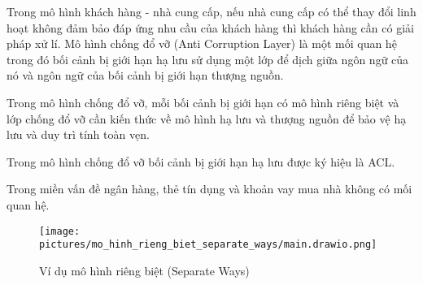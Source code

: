 
Trong mô hình khách hàng - nhà cung cấp, nếu nhà cung cấp có thể thay đổi linh hoạt không đảm bảo đáp ứng nhu cầu của khách hàng thì khách hàng cần có giải pháp xử lí. Mô hình chống đổ vỡ (Anti Corruption Layer) là một mối quan hệ trong đó bối cảnh bị giới hạn hạ lưu sử dụng một lớp để dịch giữa ngôn ngữ của nó và ngôn ngữ của bối cảnh bị giới hạn thượng nguồn.

Trong mô hình chống đổ vỡ, mỗi bối cảnh bị giới hạn có mô hình riêng biệt và lớp chống đổ vỡ cần kiến thức về mô hình hạ lưu và thượng nguồn để bảo vệ hạ lưu và duy trì tính toàn vẹn.



Trong mô hình chống đổ vỡ bối cảnh bị giới hạn hạ lưu được ký hiệu là ACL.



















\begin{example} Trong miền vấn đề ngân hàng, thẻ tín dụng và khoản vay mua nhà không có mối quan hệ.

\begin{figure}[H]

\centering

\texttt{[image: pictures/mo\_hinh\_rieng\_biet\_separate\_ways/main.drawio.png]}

\caption{Ví dụ mô hình riêng biệt (Separate Ways)}

\end{figure}

\end{example}

